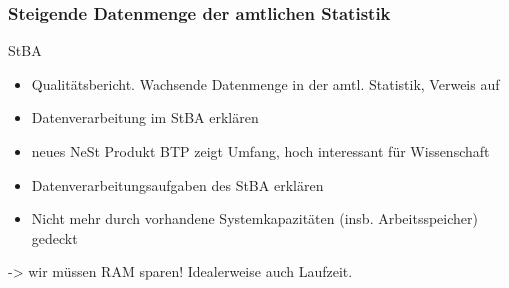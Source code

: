 \documentclass[
  german,
  10pt,
  twoside]{article}
\providecommand{\tightlist}{%
  \setlength{\itemsep}{0pt}\setlength{\parskip}{0pt}}
\begin{document}
\subsubsection{Steigende Datenmenge der amtlichen
Statistik}\label{steigende-datenmenge-der-amtlichen-statistik}

StBA

\begin{itemize}
\tightlist
\item
  Qualitätsbericht. Wachsende Datenmenge in der amtl. Statistik, Verweis
  auf \autocite{destatis2023}
\item
  Datenverarbeitung im StBA erklären
\item
  neues NeSt Produkt BTP zeigt Umfang, hoch interessant für Wissenschaft
\item
  Datenverarbeitungsaufgaben des StBA erklären
\item
  Nicht mehr durch vorhandene Systemkapazitäten (insb. Arbeitsspeicher)
  gedeckt
\end{itemize}

-\textgreater{} wir müssen RAM sparen! Idealerweise auch Laufzeit.
\end{document}
